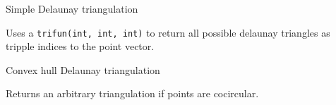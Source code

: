 
\begin{algorithm}{Simple Delaunay triangulation}

\desc
Uses a {\tt trifun(int, int, int)} to return all possible delaunay triangles as tripple indices to the point vector. 
\end{algorithm}

\begin{algorithm}{Convex hull Delaunay triangulation}

\desc
Returns an arbitrary triangulation if points are cocircular.
\end{algorithm}
